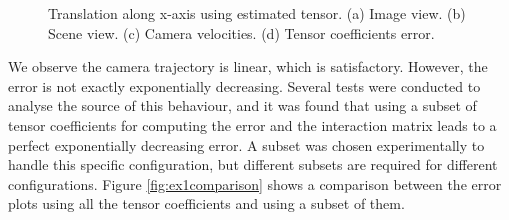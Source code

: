 \begin{figure}[ht!]
\begin{subfigure}{.48\linewidth}
    \caption{}
    \label{fig:ex1cerror}
  \end{subfigure}
  \caption{Translation along x-axis using estimated tensor. (a) Image view. (b) Scene view. (c) Camera velocities. (d) Tensor coefficients error.}
  \label{fig:ex1c}
\end{figure}

We observe the camera trajectory is linear, which is satisfactory. However, the error is not exactly exponentially decreasing. Several tests were conducted to analyse the source of this behaviour, and it was found that using a subset of tensor coefficients for computing the error and the interaction matrix leads to a perfect exponentially decreasing error. A subset was chosen experimentally to handle this specific configuration, but different subsets are required for different configurations. Figure \ref{fig:ex1comparison} shows a comparison between the error plots using all the tensor coefficients and using a subset of them.

